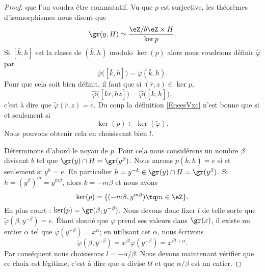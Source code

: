 \begin{proof}
    que l'on voudra être commutatif. Vu que \( p\) est surjective, les théorèmes d'isomorphismes nous disent que
    \begin{equation}
        \gr(y,H)\simeq\frac{ \eZ/b\eZ\times H }{ \ker p }.
    \end{equation}
    Si \( [\bar k,h]\) est la classe de \( (\bar k,h)\) modulo \( \ker(p)\) alors nous voudrions définir \( \hat \varphi\) par
    \begin{equation}        \label{EqeesVxc}
        \hat\varphi\big( [\bar k,h] \big)=\tilde \varphi(\bar k,h).
    \end{equation}
    Pour que cela soit bien définit, il faut que si \( (\bar r,z)\in \ker p\),
    \begin{equation}
        \hat\varphi\big( [\bar k\bar r,hz] \big)=\hat\varphi\big( [\bar k,h] \big),
    \end{equation}
    c'est à dire que \( \tilde \varphi(\bar r,z)=e\). Du coup la définition \eqref{EqeesVxc} n'est bonne que si et seulement si
    \begin{equation}
        \ker(p)\subset\ker(\tilde\varphi ).
    \end{equation}
    Nous pouvons obtenir cela en choisissant bien \( l\).

    Déterminons d'abord le noyau de \( p\). Pour cela nous considérons un nombre \( \beta\) divisant \( b\) tel que \( \gr(y)\cap H=\gr(y^{\beta})\). Nous aurons \( p(\bar k,h)=e\) si et seulement si \( y^h=e\). En particulier \( h=y^{-k}\in\gr(y)\cap H=\gr(y^{\beta})\). Si \( h=(y^{\beta})^m=y^{m\beta}\), alors \( k=-m\beta\) et nous avons
    \begin{equation}
        \ker(p)=\{ (-m\beta,y^{m\beta})\tq m\in \eZ \}.
    \end{equation}
    En plus court : \( \ker(p)=\gr(\beta,y^{-\beta})\). Nous devons donc fixer \( l\) de telle sorte que \( \tilde \varphi(\beta,y^{-\beta})=e\). Étant donné que \( \varphi\) prend ses valeurs dans \( \gr(x)\), il existe un entier \( \alpha\) tel que \( \varphi(y^{-\beta})=x^{\alpha}\); en utilisant cet \( \alpha\), nous écrivons
    \begin{equation}
        \tilde \varphi(\beta,y^{-\beta})=x^{\beta l}\varphi(y^{-\beta})=x^{\beta l+\alpha}.
    \end{equation}
    Par conséquent nous choisissons \( l=-\alpha/\beta\). Nous devons maintenant vérifier que ce choix est légitime, c'est à dire que \( a\) divise \( bl\) et que \( \alpha/\beta\) est un entier.


\end{proof}
